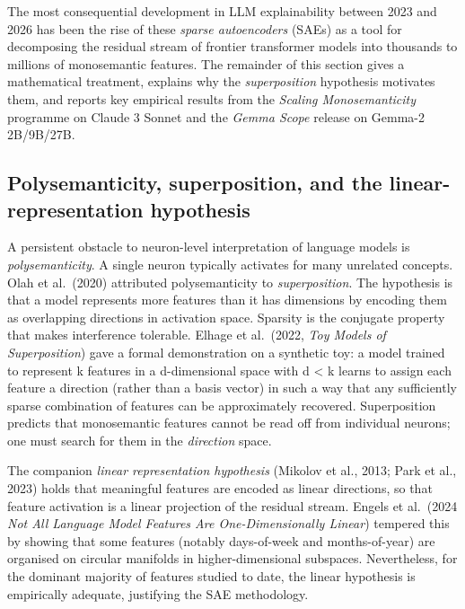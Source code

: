 \documentclass{article}
\begin{document}
The most consequential development in LLM explainability between 2023 and 2026 has been the rise of these \emph{sparse autoencoders} (SAEs) as a tool for decomposing the residual stream of frontier transformer models into thousands to millions of monosemantic features. The remainder of this section gives a mathematical treatment, explains why the \emph{superposition} hypothesis motivates them, and reports key empirical results from the \emph{Scaling Monosemanticity} programme on Claude 3 Sonnet and the \emph{Gemma Scope} release on Gemma-2 2B/9B/27B.

\subsection{Polysemanticity, superposition, and the linear-representation hypothesis}\label{polysemanticity-superposition-and-the-linear-representation-hypothesis}

A persistent obstacle to neuron-level interpretation of language models is \emph{polysemanticity}. A single neuron typically activates for many unrelated concepts. Olah et al.~(2020) attributed polysemanticity to \emph{superposition}. The hypothesis is that a model represents more features than it has dimensions by encoding them as overlapping directions in activation space. Sparsity is the conjugate property that makes interference tolerable. Elhage et al.~(2022, \emph{Toy Models of Superposition}) gave a formal demonstration on a synthetic toy: a model trained to represent k features in a d-dimensional space with d \textless{} k learns to assign each feature a direction (rather than a basis vector) in such a way that any sufficiently sparse combination of features can be approximately recovered. Superposition predicts that monosemantic features cannot be read off from individual neurons; one must search for them in the \emph{direction} space.

The companion \emph{linear representation hypothesis} (Mikolov et al., 2013; Park et al., 2023) holds that meaningful features are encoded as linear directions, so that feature activation is a linear projection of the residual stream. Engels et al.~(2024 \emph{Not All Language Model Features Are One-Dimensionally Linear}) tempered this by showing that some features (notably days-of-week and months-of-year) are organised on circular manifolds in higher-dimensional subspaces. Nevertheless, for the dominant majority of features studied to date, the linear hypothesis is empirically adequate, justifying the SAE methodology.
\end{document}
